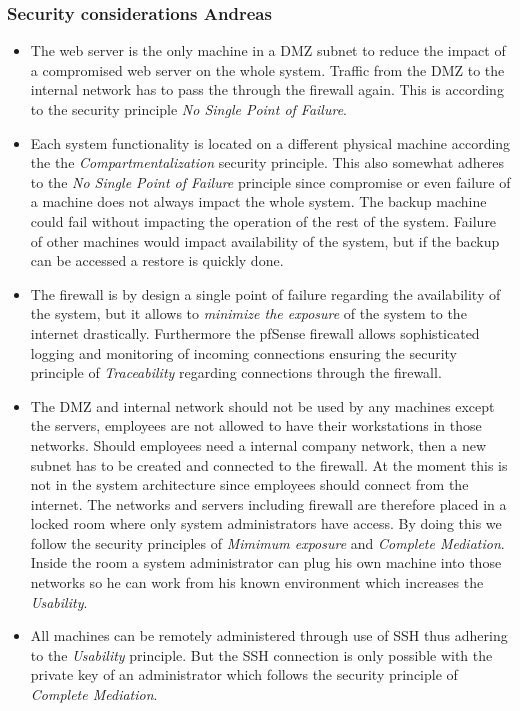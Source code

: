 \documentclass[english]{article}
\begin{document}
\subsubsection{Security considerations Andreas}
\begin{itemize}
    \item The web server is the only machine in a DMZ subnet to reduce the impact of a compromised web server on the whole system. Traffic from the DMZ to the internal network has to pass the through the firewall again. This is according to the security principle \emph{No Single Point of Failure}.
    \item Each system functionality is located on a different physical machine according the the \emph{Compartmentalization} security principle. This also somewhat adheres to the \emph{No Single Point of Failure} principle since compromise or even failure of a machine does not always impact the whole system. The backup machine could fail without impacting the operation of the rest of the system. Failure of other machines would impact availability of the system, but if the backup can be accessed a restore is quickly done.
    \item The firewall is by design a single point of failure regarding the availability of the system, but it allows to \emph{minimize the exposure} of the system to the internet drastically. Furthermore the pfSense firewall allows sophisticated logging and monitoring of incoming connections ensuring the security principle of \emph{Traceability} regarding connections through the firewall.
    \item The DMZ and internal network should not be used by any machines except the servers, employees are not allowed to have their workstations in those networks. Should employees need a internal company network, then a new subnet has to be created and connected to the firewall. At the moment this is not in the system architecture since employees should connect from the internet. The networks and servers including firewall are therefore placed in a locked room where only system administrators have access. By doing this we follow the security principles of \emph{Mimimum exposure} and \emph{Complete Mediation}. Inside the room a system administrator can plug his own machine into those networks so he can work from his known environment which increases the \emph{Usability}.
    \item All machines can be remotely administered through use of SSH thus adhering to the \emph{Usability} principle. But the SSH connection is only possible with the private key of an administrator which follows the security principle of \emph{Complete Mediation}.
\end{itemize}
\end{document}
